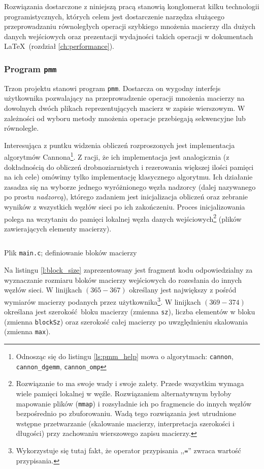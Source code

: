 Rozwiązania dostarczone z niniejszą pracą stanowią konglomerat kilku technologii programistycznych, których celem jest dostarczenie narzędza służącego przeprowadzaniu równoległych operacji szybkiego mnożenia macierzy dla dużych danych wejściowych oraz prezentacji wydajności takich operacji w dokumentach \LaTeX \, (rozdział \ref{ch:performance}). 

\subsubsection{Program \texttt{pmm}}

Trzon projektu stanowi program \texttt{pmm}. Dostarcza on wygodny interfejs użytkownika pozwalający na przeprowadzenie operacji mnożenia macierzy na dowolnych dwóch plikach reprezentujących macierz w zapisie wierszowym. W zależności od wyboru metody mnożenia operacje przebiegają sekwencyjne lub równolegle.

Interesująca z puntku widzenia obliczeń rozproszonych jest implementacja algorytmów Cannona\footnote{Odnosząc się do listingu \ref{ls:pmm_help} mowa o algorytmach: \texttt{cannon}, \texttt{cannon\_dgemm}, \texttt{cannon\_omp}}. Z racji, że ich implementacja jest analogicznia (z dokładnością do obliczeń drobnoziarnistych i rezerowania większej ilości pamięci na ich cele) omówimy tylko implementację klasycznego algorytmu. Ich działanie zasadza się na wyborze jednego wyróżnionego węzła nadzorcy (dalej nazywanego po prostu \emph{nadzorcą}), którego zadaniem jest inicjalizacja obliczeń oraz zebranie wyników z wszystkich węzłów sieci po ich zakończeniu. Proces inicjalizowania polega na wczytaniu do pamięci lokalnej węzła danych wejściowych\footnote{Rozwiązanie to ma swoje wady i swoje zalety. Przede wszystkim wymaga wiele pamięci lokalnej w węźle. Rozwiązaniem alternatywnym byłoby mapowanie plików (\texttt{mmap}) i rozsyładnie ich po fragmencie do innych węzłów bezpośrednio po zbuforowaniu. Wadą tego rozwiązania jest utrudnione wstępne przetwarzanie (skalowanie macierzy, interpretacja szerokości i długości) przy zachowaniu wierszowego zapisu macierzy.} (plików zawierających elementy macierzy). 

\begin{listing}[H]
\inputminted[fontsize=\footnotesize,bgcolor=bg,linenos,firstnumber=365,firstline=365,lastline=377]{c}{includes/listings/main.c}
\caption{Plik \texttt{main.c}; definiowanie bloków macierzy}
\label{l:block_size}
\end{listing}

Na listingu \ref{l:block_size} zaprezentowany jest fragment kodu odpowiedzialny za wyznaczanie rozmiaru bloków macierzy wejściowych do rozesłania do innych węzłów sieci. W linijkach \((365-367)\) określany jest największy z pośród wymiarów macierzy podanych przez użytkownika\footnote{Wykorzystuje się tutaj fakt, że operator przypisania ,,\texttt{=}'' zwraca wartość przypisania.}. W linijkach \((369-374)\) określana jest szerokość bloku macierzy (zmienna \texttt{sz}), liczba elementów w bloku (zmienna \texttt{blockSz}) oraz szerokość całej macierzy po uwzględnieniu skalowania (zmienna \texttt{max}).

